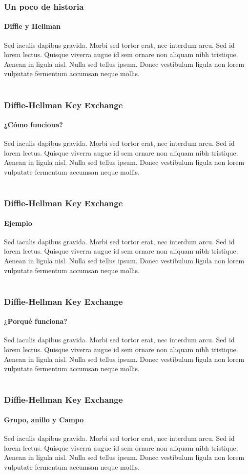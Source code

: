 \documentclass[spanish, mexico]{beamer}
\begin{document}
	\begin{frame}
		\frametitle{Un poco de historia}
		\framesubtitle{Diffie y Hellman}
		Sed iaculis dapibus gravida. Morbi sed tortor erat, nec interdum arcu. Sed id lorem lectus. Quisque viverra augue id sem ornare non aliquam nibh tristique. Aenean in ligula nisl. Nulla sed tellus ipsum. Donec vestibulum ligula non lorem vulputate fermentum accumsan neque mollis.\\~\\
	\end{frame}

	\begin{frame}
		\frametitle{Diffie-Hellman Key Exchange}
		\framesubtitle{¿Cómo funciona?}
		Sed iaculis dapibus gravida. Morbi sed tortor erat, nec interdum arcu. Sed id lorem lectus. Quisque viverra augue id sem ornare non aliquam nibh tristique. Aenean in ligula nisl. Nulla sed tellus ipsum. Donec vestibulum ligula non lorem vulputate fermentum accumsan neque mollis.\\~\\
	\end{frame}

	\begin{frame}
		\frametitle{Diffie-Hellman Key Exchange}
		\framesubtitle{Ejemplo}
		Sed iaculis dapibus gravida. Morbi sed tortor erat, nec interdum arcu. Sed id lorem lectus. Quisque viverra augue id sem ornare non aliquam nibh tristique. Aenean in ligula nisl. Nulla sed tellus ipsum. Donec vestibulum ligula non lorem vulputate fermentum accumsan neque mollis.\\~\\
	\end{frame}

	\begin{frame}
		\frametitle{Diffie-Hellman Key Exchange}
		\framesubtitle{¿Porqué funciona?}
		Sed iaculis dapibus gravida. Morbi sed tortor erat, nec interdum arcu. Sed id lorem lectus. Quisque viverra augue id sem ornare non aliquam nibh tristique. Aenean in ligula nisl. Nulla sed tellus ipsum. Donec vestibulum ligula non lorem vulputate fermentum accumsan neque mollis.\\~\\
	\end{frame}

	\begin{frame}
		\frametitle{Diffie-Hellman Key Exchange}
		\framesubtitle{Grupo, anillo y Campo}
		Sed iaculis dapibus gravida. Morbi sed tortor erat, nec interdum arcu. Sed id lorem lectus. Quisque viverra augue id sem ornare non aliquam nibh tristique. Aenean in ligula nisl. Nulla sed tellus ipsum. Donec vestibulum ligula non lorem vulputate fermentum accumsan neque mollis.\\~\\
	\end{frame}
\end{document}

